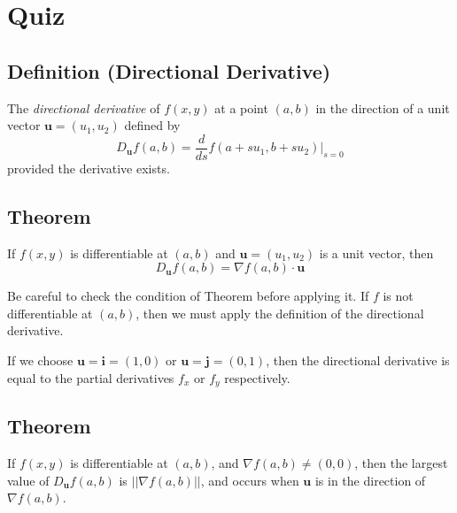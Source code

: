 \section{Quiz}
\begin{figure}[ht]
    \centering
    
  \end{figure}
\begin{defbox}
\subsection{Definition (Directional Derivative)}
The \emph{directional derivative} of $ f(x,y) $ at a point $ (a,b) $ 
in the direction of a unit vector $ \mathbf{u}=(u_1,u_2) $ 
defined by
\[ D_{\mathbf{u}}f(a,b)=
\frac{d}{ds} f(a+su_1,b+su_2)\Bigr\rvert_{s=0} \]
provided the derivative exists.
\end{defbox}

\begin{thmbox}
\subsection{Theorem}
If $ f(x,y) $ is differentiable at $ (a,b) $ and 
$ \mathbf{u}=(u_1,u_2) $ is a unit vector, then
\[ D_{\mathbf{u}}f(a,b)=\nabla f(a,b) \cdot \mathbf{u} \]
\end{thmbox}

\begin{remark}
    Be careful to check the condition of Theorem before
    applying it. If $ f $ is not differentiable at
    $ (a,b) $, then we must apply the definition of the
    directional derivative.
\end{remark}
\begin{remark}
    If we choose $ \mathbf{u}=\mathbf{i}=(1,0) $ or
    $ \mathbf{u}=\mathbf{j}=(0,1) $, then the directional
    derivative is equal to the partial derivatives $ f_x $ or $ f_y $
    respectively.
\end{remark}

\begin{thmbox}
\subsection{Theorem}
If $ f(x,y) $ is differentiable at $ (a,b) $, and
$ \nabla f(a,b)\neq (0,0) $, then the largest value of
$ D_{\mathbf{u}}f(a,b) $ is $ ||\nabla f(a,b)|| $, and
occurs when $ \mathbf{u} $ is in the direction of
$ \nabla f(a,b) $.
\end{thmbox}

